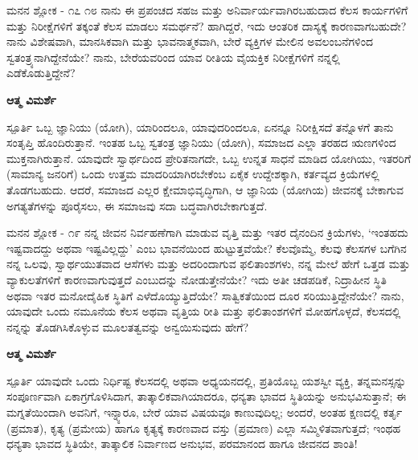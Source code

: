 \newpage
\begin{mananam}{\mananamfont ಮನನ ಶ್ಲೋಕ - ೧೭ ೧೮}
\mananamtext ನಾನು ಈ ಪ್ರಪಂಚದ ಸಹಜ ಮತ್ತು ಅನಿರ್ವಾರ್ಯವಾಗಿರಬಹುದಾದ ಕೆಲಸ ಕಾರ್ಯಗಳಿಗೆ ಮತ್ತು ನಿರೀಕ್ಷೆಗಳಿಗೆ ತಕ್ಕಂತೆ ಕೆಲಸ ಮಾಡಲು ಸಮರ್ಥನೆ? ಹಾಗಿದ್ದರೆ, ಇದು ಆಂತರಿಕ ದಾಸ್ಯಕ್ಕೆ ಕಾರಣವಾಗಬಹುದೇ? ನಾನು ವಿಶೇಷವಾಗಿ, ಮಾನಸಿಕವಾಗಿ ಮತ್ತು ಭಾವನಾತ್ಮಕವಾಗಿ, ಬೇರೆ ವ್ಯಕ್ತಿಗಳ ಮೇಲಿನ ಅವಲಂಬನೆಗಳಿಂದ ಸ್ವತಂತ್ರ್ಯನಾಗಿದ್ದೇನೆಯೇ? ನಾನು, ಬೇರೆಯವರಿಂದ ಯಾವ ರೀತಿಯ ವೈಯಕ್ತಿಕ ನಿರೀಕ್ಷೆಗಳಿಗೆ ನನ್ನಲ್ಲಿ ಎಡೆಕೊಡುತ್ತಿದ್ದೇನೆ?
\end{mananam}
\WritingHand\enspace\textbf{ಆತ್ಮ ವಿಮರ್ಶೆ}\\
\begin{inspiration}{\mananamfont ಸ್ಪೂರ್ತಿ}
\mananamtext ಒಬ್ಬ ಜ್ಞಾನಿಯು (ಯೋಗಿ), ಯಾರಿಂದಲೂ, ಯಾವುದರಿಂದಲೂ, ಏನನ್ನೂ ನಿರೀಕ್ಷಿಸದೆ ತನ್ನೊಳಗೆ ತಾನು ಸಂತೃಪ್ತಿ ಹೊಂದಿರುತ್ತಾನೆ. ಇಂತಹ ಒಬ್ಬ ಸ್ವತಂತ್ರ ಜ್ಞಾನಿಯು (ಯೋಗಿ), ಸಮಾಜದ ಎಲ್ಲಾ ತರಹದ ಋಣಗಳಿಂದ ಮುಕ್ತನಾಗಿರುತ್ತಾನೆ. ಯಾವುದೇ ಸ್ವಾರ್ಥದಿಂದ ಪ್ರೇರಿತನಾಗದೇ, ಒಬ್ಬ ಉನ್ನತ ಸಾಧನೆ ಮಾಡಿದ ಯೋಗಿಯು, ಇತರರಿಗೆ (ಸಾಮಾನ್ಯ ಜನರಿಗೆ) ಒಂದು ಉತ್ತಮ ಮಾದರಿಯಾಗಿರಬೇಕೆಂಬ ಏಕೈಕ ಉದ್ದೇಶಕ್ಕಾಗಿ, ಕರ್ತವ್ಯದ ಕ್ರಿಯೆಗಳಲ್ಲಿ ತೊಡಗಬಹುದು. ಆದರೆ, ಸಮಾಜದ ಎಲ್ಲರ ಕ್ಷೇಮಾಭಿವೃದ್ಧಿಗಾಗಿ, ಆ ಜ್ಞಾನಿಯ (ಯೋಗಿಯ) ಜೀವನಕ್ಕೆ ಬೇಕಾಗುವ ಅಗತ್ಯತೆಗಳನ್ನು ಪೂರೈಸಲು, ಈ ಸಮಾಜವು ಸದಾ ಬದ್ಧವಾಗಿರಬೇಕಾಗುತ್ತದೆ.
\end{inspiration}
\newpage

\begin{mananam}{\mananamfont ಮನನ ಶ್ಲೋಕ - ೧೯}
\mananamtext ನನ್ನ ಜೀವನ ನಿರ್ವಹಣೆಗಾಗಿ ಮಾಡುವ ವೃತ್ತಿ ಮತ್ತು ಇತರ ದೈನಂದಿನ ಕ್ರಿಯೆಗಳು, ‘ಇಂತಹದು ಇಷ್ಟವಾದದ್ದು ಅಥವಾ ಇಷ್ಟವಿಲ್ಲದ್ದು’ ಎಂಬ ಭಾವನೆಯಿಂದ ಹುಟ್ಟುತ್ತವೆಯೇ? ಕೆಲವೊಮ್ಮೆ, ಕೆಲವು ಕೆಲಸಗಳ ಬಗೆಗಿನ ನನ್ನ ಒಲವು, ಸ್ವಾರ್ಥಯುತವಾದ ಆಸೆಗಳು ಮತ್ತು ಅದರಿಂದಾಗುವ ಫಲಿತಾಂಶಗಳು, ನನ್ನ ಮೇಲೆ  ಹೇಗೆ ಒತ್ತಡ ಮತ್ತು ವ್ಯಾಕುಲತೆಗಳಿಗೆ ಕಾರಣವಾಗುವುತ್ತದೆ ಎಂಬುದನ್ನು ನೋಡುತ್ತೇನೆಯೇ? ಇದು ಅತೀ ಚಡಪಡಿಕೆ, ನಿದ್ರಾಹೀನ ಸ್ಥಿತಿ ಅಥವಾ ಇತರ ಮನೋದೈಹಿಕ ಸ್ಥಿತಿಗೆ ಎಳೆದೊಯ್ಯುತ್ತಿದೆಯೇ? ಸಾತ್ವಿಕತೆಯಿಂದ ದೂರ ಸರಿಯುತ್ತಿದ್ದೇನೆಯೇ? ನಾನು, ಯಾವುದೇ ಒಂದು ನಮೂನೆಯ ಕೆಲಸ ಅಥವಾ ವೃತ್ತಿಯ ರೀತಿ ಮತ್ತು ಫಲಿತಾಂಶಗಳಿಗೆ ಮೋಹಗೊಳ್ಳದೆ, ಕೆಲಸದಲ್ಲಿ ನನ್ನನ್ನು ತೊಡಗಿಸಿಕೊಳ್ಳುವ ಮೂಲತತ್ವವನ್ನು ಅನ್ವಯಿಸುವುದು ಹೇಗೆ? 
\end{mananam}
\WritingHand\enspace\textbf{ಆತ್ಮ ವಿಮರ್ಶೆ}\\
\begin{inspiration}{\mananamfont ಸ್ಪೂರ್ತಿ}
\mananamtext ಯಾವುದೇ ಒಂದು ನಿರ್ಧಿಷ್ಟ ಕೆಲಸದಲ್ಲಿ ಅಥವಾ ಅಧ್ಯಯನದಲ್ಲಿ, ಪ್ರತಿಯೊಬ್ಬ ಯಶಸ್ವೀ ವ್ಯಕ್ತಿ, ತನ್ನಮನಸ್ಸನ್ನು ಸಂಪೂರ್ಣವಾಗಿ ಏಕಾಗ್ರಗೊಳಿಸಿದಾಗ, ತಾತ್ಕಾಲಿಕವಾಗಿಯಾದರೂ, ಧನ್ಯತಾ ಭಾವದ ಸ್ಥಿತಿಯನ್ನು ಅನುಭವಿಸುತ್ತಾನೆ; ಈ ಮಗ್ನತೆಯಿಂದಾಗಿ ಅವನಿಗೆ, ಇನ್ನ್ಯಾರೂ, ಬೇರೆ ಯಾವ ವಿಷಯವೂ ಕಾಣುವುದಿಲ್ಲ; ಅಂದರೆ, ಅಂತಹ ಕ್ಷಣದಲ್ಲಿ ಕರ್ತೃ (ಪ್ರಮಾತ), ಕೃತ್ಯ (ಪ್ರಮೇಯ) ಹಾಗೂ ಕೃತ್ಯಕ್ಕೆ ಕಾರಣವಾದ ವಸ್ತು (ಪ್ರಮಾಣ) ಎಲ್ಲಾ ಸಮ್ಮಿಳಿತವಾಗುತ್ತದೆ; ಇಂಥಹ ಧನ್ಯತಾ ಭಾವದ ಸ್ಥಿತಿಯೇ, ತಾತ್ಕಾಲಿಕ ನಿರ್ವಾಣದ ಅನುಭವ, ಪರಮಾನಂದ ಹಾಗೂ ಜೀವನದ ಶಾಂತಿ! 
\end{inspiration}
\newpage

